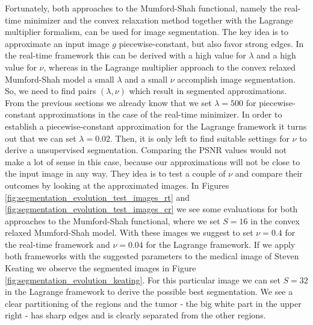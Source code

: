 \documentclass[abstracton]{scrreprt}
\begin{document}
            Fortunately, both approaches to the Mumford-Shah functional, namely the real-time minimizer and the convex relaxation method together with the Lagrange multiplier formalism, can be used for image segmentation. The key idea is to approximate an input image $g$ piecewise-constant, but also favor strong edges. In the real-time framework this can be derived with a high value for $\lambda$ and a high value for $\nu$, whereas in the Lagrange multiplier approach to the convex relaxed Mumford-Shah model a small $\lambda$ and a small $\nu$ accomplish image segmentation. So, we need to find pairs $(\lambda, \nu)$ which result in segmented approximations. From the previous sections we already know that we set $\lambda = 500$ for piecewise-constant approximations in the case of the real-time minimizer. In order to establish a piecewise-constant approximation for the Lagrange framework it turns out that we can set $\lambda = 0.02$. Then, it is only left to find suitable settings for $\nu$ to derive a unsupervised segmentation. Comparing the PSNR values would not make a lot of sense in this case, because our approximations will not be close to the input image in any way. They idea is to test a couple of $\nu$ and compare their outcomes by looking at the approximated images. In Figures \ref{fig:segmentation_evolution_test_images_rt} and \ref{fig:segmentation_evolution_test_images_cr} we see some evaluations for both approaches to the Mumford-Shah functional, where we set $S = 16$ in the convex relaxed Mumford-Shah model. With these images we suggest to set $\nu = 0.4$ for the real-time framework and $\nu = 0.04$ for the Lagrange framework. If we apply both frameworks with the suggested parameters to the medical image of Steven Keating we observe the segmented images in Figure \ref{fig:segmentation_evolution_keating}. For this particular image we can set $S = 32$ in the Lagrange framework to derive the possible best segmentation. We see a clear partitioning of the regions and the tumor - the big white part in the upper right - has sharp edges and is clearly separated from the other regions.\newpage
\end{document}
